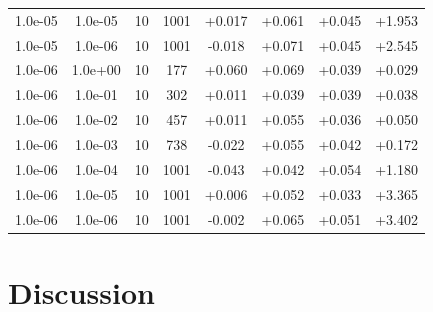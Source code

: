 \documentclass[11pt,a4paper]{article}
\begin{document}
\begin{table}[t]
{\begin{tabular}{*{8}c}
\rowcolor{red} 1.0e-05 	 & 1.0e-05 	 & 10 & 1001 	 & +0.017 & +0.061 & +0.045 & +1.953 \\ 
\rowcolor{red}  1.0e-05 	 & 1.0e-06 	 & 10 & 1001 	 & -0.018 & +0.071 & +0.045 & +2.545 \\ 
 1.0e-06 	 & 1.0e+00 	 & 10 & 177 	 & +0.060 & +0.069 & +0.039 & +0.029 \\ 
 1.0e-06 	 & 1.0e-01 	 & 10 & 302 	 & +0.011 & +0.039 & +0.039 & +0.038 \\ 
 1.0e-06 	 & 1.0e-02 	 & 10 & 457 	 & +0.011 & +0.055 & +0.036 & +0.050 \\ 
\rowcolor{orange} 1.0e-06 	 & 1.0e-03 	 & 10 & 738 	 & -0.022 & +0.055 & +0.042 & +0.172 \\ 
\rowcolor{red}  1.0e-06 	 & 1.0e-04 	 & 10 & 1001 	 & -0.043 & +0.042 & +0.054 & +1.180 \\ 
\rowcolor{red}  1.0e-06 	 & 1.0e-05 	 & 10 & 1001 	 & +0.006 & +0.052 & +0.033 & +3.365 \\ 
\rowcolor{red}  1.0e-06 	 & 1.0e-06 	 & 10 & 1001 	 & -0.002 & +0.065 & +0.051 & +3.402 \\ 
\end{tabular}}
\label{Tab::5}
\end{table} 
%
%
%
%
\section{Discussion}
\end{document}
